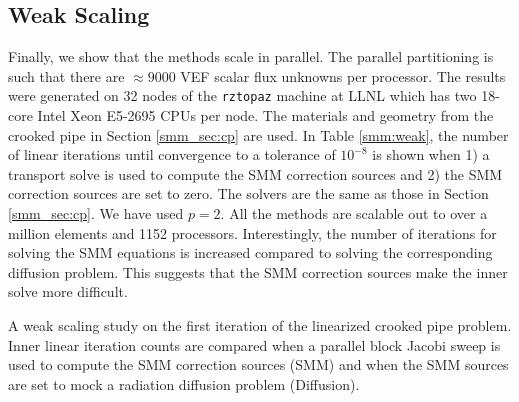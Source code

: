 \documentclass[../doc.tex]{subfiles}
\begin{document}
\subsection{Weak Scaling} \label{smm_sec:weak}
Finally, we show that the methods scale in parallel. The parallel partitioning is such that there are $\approx\!\num{9000}$ VEF scalar flux unknowns per processor. The results were generated on 32 nodes of the \texttt{rztopaz} machine at LLNL which has two 18-core Intel Xeon E5-2695 CPUs per node. The materials and geometry from the crooked pipe in Section \ref{smm_sec:cp} are used. In Table \ref{smm:weak}, the number of linear iterations until convergence to a tolerance of $10^{-8}$ is shown when 1) a transport solve is used to compute the SMM correction sources and 2) the SMM correction sources are set to zero. The solvers are the same as those in Section \ref{smm_sec:cp}. We have used $p=2$. 
All the methods are scalable out to over a million elements and 1152 processors. Interestingly, the number of iterations for solving the SMM equations is increased compared to solving the corresponding diffusion problem. This suggests that the SMM correction sources make the inner solve more difficult. 
\begin{table}
\centering
\caption{A weak scaling study on the first iteration of the linearized crooked pipe problem. Inner linear iteration counts are compared when a parallel block Jacobi sweep is used to compute the SMM correction sources (SMM) and when the SMM sources are set to mock a radiation diffusion problem (Diffusion). }
\label{smm:weak}

\end{table}
\end{document}

